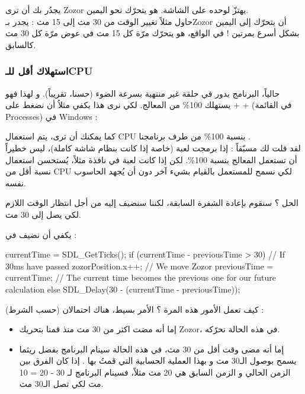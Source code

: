 يجدُر بك أن ترى
\textenglish{Zozor}
يهتزّ لوحده على الشاشة. هو يتحرّك نحو اليمين. \\
حاول مثلاً تغيير الوقت من 30 مث إلى 15 مث : يجدر بـ\textenglish{Zozor}
أن يتحرّك إلى اليمين بشكل أسرع بمرتين ! في الواقع، هو يتحرّك مرّة كل 15 مث في عوض مرّة كل 30 مث كالسابق.

\subsubsection{استهلاك أقل للـ\textenglish{CPU}}

حالياً، البرنامج يدور في حلقة غير منتهية بسرعة الضوء (حسنا، تقريباً). و لهذا فهو يستهلك 100\% من المعالج. لكي نرى هذا يكفي مثلاُ أن نضغط على 
 +  + 
(في القائمة
\textenglish{Processes})
في
\textenglish{Windows} :


كما يمكنك أن ترى، يتم استعمال
\textenglish{CPU}
بنسبة 100\% من طرف برنامجنا
.\\
لقد قلت لك مسبّقاً : إذا برمجت لعبة (خاصة إذا كانت بنظام شاشة كاملة)، ليس خطيراً أن تستعمل المعالج بنسبة 100\%. لكن إذا كانت لعبة في نافذة مثلاً، يُستحسن استعمال نسبة أقل من
\textenglish{CPU}
لكي نسمح للمستعمل بالقيام بشيء آخر دون أن يُجهد الحاسوب نفسه.

الحل ؟ سنقوم بإعادة الشفرة السابقة، لكننا سنضيف إليه
من أجل انتظار الوقت اللازم لكي يصل إلى 30 مث.

يكفي أن نضيف
في 
 :

\begin{Csource}
currentTime = SDL_GetTicks();
if (currentTime - previousTime > 30) // If 30ms have passed
{
	zozorPosition.x++; // We move Zozor
	previousTime = currentTime; // The current time becomes the previous one for our future calculation
}
else
{
	SDL_Delay(30 - (currentTime - previousTime));
}
\end{Csource}

كيف تعمل الأمور هذه المرة ؟ الأمر بسيط، هناك احتمالان (حسب الشرط) :

\begin{itemize}
	\item إما أنه مضت اكثر من 30 مث منذ قمنا بتحريك
	\textenglish{Zozor}،
	في هذه الحالة نحرّكه.
	\item إما أنه مضى وقت أقل من 30 مث، في هذه الحالة سينام البرنامج بفضل
	ريثما يسمح بوصول الـ30 مث و بهذا العملية الحسابية التي قمتُ بها
	.
	إذا كان الفرق بين الزمن الحالي و الزمن السابق هي 20 مث مثلاً، فسينام البرنامج لـ
	30 - 20 = 10
	مث لكي تصل الـ30 مث.
\end{itemize}

